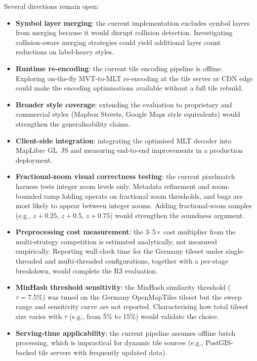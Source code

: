 Several directions remain open:

\begin{itemize}
    \item \textbf{Symbol layer merging}: the current implementation excludes symbol layers from merging because it would disrupt collision detection. Investigating collision-aware merging strategies could yield additional layer count reductions on label-heavy styles.
    \item \textbf{Runtime re-encoding}: the current tile encoding pipeline is offline. Exploring on-the-fly MVT-to-MLT re-encoding at the tile server or \ac{CDN} edge could make the encoding optimisations available without a full tile rebuild.
    \item \textbf{Broader style coverage}: extending the evaluation to proprietary and commercial styles (Mapbox Streets, Google Maps style equivalents) would strengthen the generalisability claims.
    \item \textbf{Client-side integration}: integrating the optimised \ac{MLT} decoder into MapLibre GL~JS and measuring end-to-end improvements in a production deployment.
    \item \textbf{Fractional-zoom visual correctness testing}: the current pixelmatch harness tests integer zoom levels only. Metadata refinement and zoom-bounded ramp folding operate on fractional zoom thresholds, and bugs are most likely to appear between integer zooms. Adding fractional-zoom samples (e.g., $z + 0.25$, $z + 0.5$, $z + 0.75$) would strengthen the soundness argument.
    \item \textbf{Preprocessing cost measurement}: the 3--5$\times$ cost multiplier from the multi-strategy competition is estimated analytically, not measured empirically. Reporting wall-clock time for the Germany tileset under single-threaded and multi-threaded configurations, together with a per-stage breakdown, would complete the R3 evaluation.
    \item \textbf{MinHash threshold sensitivity}: the MinHash similarity threshold ($\tau = 7.5\%$) was tuned on the Germany OpenMapTiles tileset but the sweep range and sensitivity curve are not reported. Characterising how total tileset size varies with $\tau$ (e.g., from 5\% to 15\%) would validate the choice.
    \item \textbf{Serving-time applicability}: the current pipeline assumes offline batch processing, which is impractical for dynamic tile sources (e.g., PostGIS-backed tile servers with frequently updated data).

\end{itemize}
